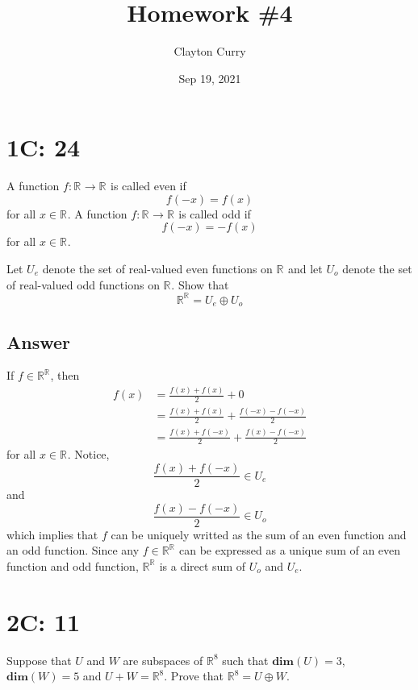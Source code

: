 \documentclass[
	12pt, %
]{fphw}
\title{Homework \#4} %
\author{Clayton Curry} %
\date{Sep 19, 2021} %
\institute{University of Oklahoma \\ Department of Mathematics} %
\newcommand\0{\mathbf{0}}
\newcommand\qed{\text{$\blacksquare$}}
\newcommand\R[1]{\text{$\mathbb{R}^{#1}$}}
\renewcommand\dim[1]{\mathbf{dim}(#1)}
\begin{document}
\maketitle %


\section*{1C: 24}

\begin{problem}
A function $f : \R{} \to \R{}$ is called even if
$$
f(-x) = f (x)
$$
for all $x \in \R{}$. A function $f : \R{} \to \R{}$ is called odd if
$$
f(-x) = -f(x)
$$
for all $x \in \R{}$. 

Let $U_e$ denote the set of real-valued even functions on $\R{}$ and let $U_o$ denote the set of real-valued odd functions on $\R{}$. Show that
$$
\R{\R{}} = U_e \oplus U_o
$$
\end{problem}


\subsection*{Answer} 
If $f \in \R{\R{}}$, then
\begin{align*}
f(x) &= \frac{f(x) + f(x)}{2} + 0\\
&=\frac{f(x) + f(x)}{2} + \frac{f(-x) - f(-x)}{2}\\
&=\frac{f(x) + f(-x)}{2} + \frac{f(x) - f(-x)}{2}
\end{align*}
for all $x \in \R{}$. Notice, 
$$
\frac{f(x) + f(-x)}{2} \in U_e
$$
and
$$
 \frac{f(x) - f(-x)}{2} \in U_o
$$
which implies that $f$ can be uniquely writted as the sum of an even function and an odd function. Since any $f \in \R{\R{}}$ can be expressed as a unique sum of an even function and odd function, $\R{\R{}}$ is a direct sum of $U_o$  and $U_e$. \qed

\newpage
\section*{2C: 11}
\begin{problem}
Suppose that $U$ and $W$ are subspaces of $\R{8}$ such that $\dim{U} = 3$, $\dim{W} = 5$ and $U + W = \R{8}$. Prove that $\R{8} = U \oplus W$.
\end{problem}
\end{document}
